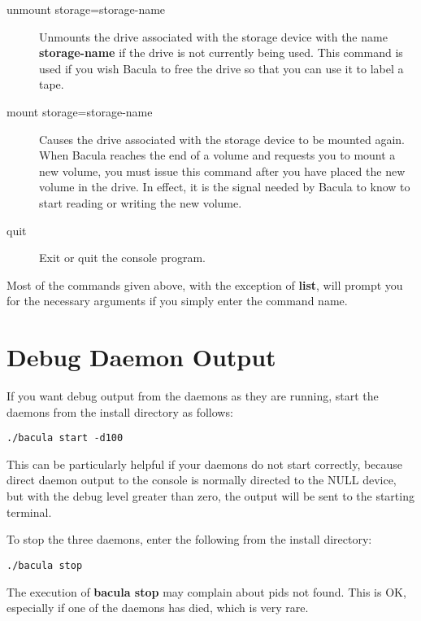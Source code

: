\begin{description}
\item [unmount storage=storage-name]
   Unmounts the drive associated with the storage  device with the name {\bf
storage-name} if the drive is not currently being  used. This command is used
if you wish Bacula to free the drive so  that you can use it to label a tape. 


\item [mount storage=storage-name]
   Causes the drive associated with the  storage device to be mounted again. When
Bacula reaches the end of a volume and requests you to mount a  new volume,
you must issue this command after you have placed the  new volume in the
drive. In effect, it is the signal needed by  Bacula to know to start reading
or writing the new volume.  

\item [quit]
   Exit or quit the console program. 
\end{description}

Most of the commands given above, with the exception of {\bf list}, will
prompt you for the necessary arguments if you simply enter the command name. 

\section{Debug Daemon Output}

If you want debug output from the daemons as they are running, start the
daemons from the install directory as follows: 

\footnotesize
\begin{verbatim}
./bacula start -d100
\end{verbatim}
\normalsize

This can be particularly helpful if your daemons do not start correctly,
because direct daemon output to the console is normally directed to the
NULL device, but with the debug level greater than zero, the output
will be sent to the starting terminal.

To stop the three daemons, enter the following from the install directory: 

\footnotesize
\begin{verbatim}
./bacula stop
\end{verbatim}
\normalsize

The execution of {\bf bacula stop} may complain about pids not found. This is
OK, especially if one of the daemons has died, which is very rare. 

